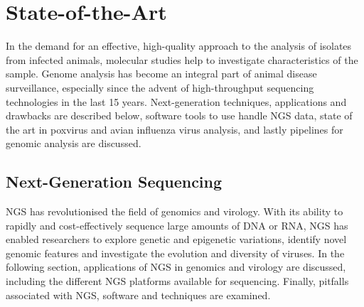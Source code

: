 \chapter{State-of-the-Art}\label{chap:state-art}
In the demand for an effective, high-quality approach to the analysis of isolates from infected animals, molecular studies help to investigate characteristics of the sample. Genome analysis has become an integral part of animal disease surveillance, especially since the advent of high-throughput sequencing technologies in the last 15 years. Next-generation techniques, applications and drawbacks are described below, software tools to use handle \ac{NGS} data, state of the art in poxvirus and avian influenza virus analysis, and lastly pipelines for genomic analysis are discussed.

\section{Next-Generation Sequencing}
\ac{NGS} has revolutionised the field of genomics and virology. With its ability to rapidly and cost-effectively sequence large amounts of \ac{DNA} or \ac{RNA}, \ac{NGS} has enabled researchers to explore genetic and epigenetic variations, identify novel genomic features and investigate the evolution and diversity of viruses. In the following section, applications of \ac{NGS} in genomics and virology are discussed, including the different \ac{NGS} platforms available for sequencing. Finally, pitfalls associated with \ac{NGS}, software and techniques are examined.


